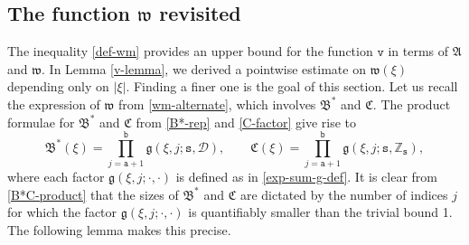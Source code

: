 \documentclass[12pt, twoside]{article}
\theoremstyle{definition}
\numberwithin{equation}{section}
\begin{document}
\subsection{The function $\mathfrak w$ revisited}
The inequality \eqref{def-wm} provides an upper bound for the function $\mathtt v$ in terms of $\mathfrak A$ and $\mathfrak w$. In Lemma \ref{v-lemma}, we derived a pointwise estimate on $\mathfrak w(\xi)$ depending only on $|\xi|$. Finding a finer one is the goal of this section. 
\vskip0.1in 
\noindent Let us recall the expression of $\mathfrak w$ from \eqref{wm-alternate}, which involves $\mathfrak B^{\ast}$ and $\mathfrak C$. The product formulae for $\mathfrak B^{\ast}$ and $\mathfrak C$ from \eqref{B*-rep} and \eqref{C-factor} give rise to 
\begin{equation} \label{B*C-product}
\mathfrak B^{\ast}(\xi) = \prod_{j = \mathtt a + 1}^{\mathtt b} \mathfrak g(\xi, j; \mathtt s, \mathscr{D}), \qquad \mathfrak C(\xi) = \prod_{j=\mathtt a+1}^{\mathtt b} \mathfrak g(\xi, j; \mathtt s, \mathbb Z_{\mathtt s}), 
\end{equation} 
where each factor $\mathfrak g(\xi, j; \cdot, \cdot)$ is defined as in \eqref{exp-sum-g-def}. It is clear from \eqref{B*C-product} that the sizes of $\mathfrak B^{\ast}$ and $\mathfrak C$ are dictated by the number of indices $j$ for which the factor $\mathfrak g(\xi, j; \cdot, \cdot)$ is quantifiably smaller than the trivial bound 1. The following lemma makes this precise.  
\end{document}
